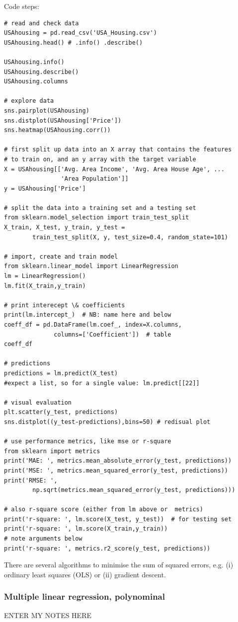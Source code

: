 \documentclass[12pt]{article}
\begin{document}
Code steps:
\begin{lstlisting}
# read and check data
USAhousing = pd.read_csv('USA_Housing.csv')
USAhousing.head() # .info() .describe()

USAhousing.info()
USAhousing.describe()
USAhousing.columns

# explore data
sns.pairplot(USAhousing)
sns.distplot(USAhousing['Price'])
sns.heatmap(USAhousing.corr())

# first split up data into an X array that contains the features 
# to train on, and an y array with the target variable
X = USAhousing[['Avg. Area Income', 'Avg. Area House Age', ... 
				'Area Population']]
y = USAhousing['Price']

# split the data into a training set and a testing set
from sklearn.model_selection import train_test_split
X_train, X_test, y_train, y_test = 
		train_test_split(X, y, test_size=0.4, random_state=101)

# import, create and train model
from sklearn.linear_model import LinearRegression
lm = LinearRegression()
lm.fit(X_train,y_train)

# print interecept \& coefficients
print(lm.intercept_)  # NB: name here and below
coeff_df = pd.DataFrame(lm.coef_, index=X.columns, 
              columns=['Coefficient'])  # table
coeff_df

# predictions
predictions = lm.predict(X_test)
#expect a list, so for a single value: lm.predict[[22]]

# visual evaluation
plt.scatter(y_test, predictions)
sns.distplot((y_test-predictions),bins=50) # redisual plot

# use performance metrics, like mse or r-square
from sklearn import metrics
print('MAE: ', metrics.mean_absolute_error(y_test, predictions))
print('MSE: ', metrics.mean_squared_error(y_test, predictions))
print('RMSE: ', 
		np.sqrt(metrics.mean_squared_error(y_test, predictions)))

# also r-square score (either from lm above or  metrics)
print('r-square: ', lm.score(X_test, y_test))  # for testing set
print('r-square: ', lm.score(X_train,y_train))
# note arguments below
print('r-square: ', metrics.r2_score(y_test, predictions))
\end{lstlisting}

There are several algorithms to minimise the sum of squared errors, e.g. (i)  ordinary least squares (OLS) or (ii) gradient descent.


\subsubsection{Multiple linear regression, polynominal}
ENTER MY NOTES HERE
\end{document}
